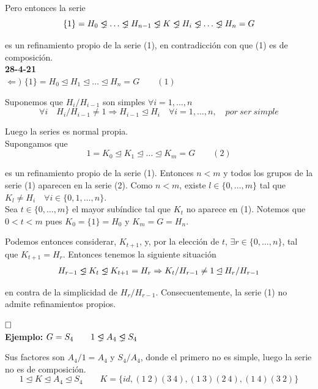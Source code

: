 \documentclass{article}
\newcommand{\unlhdneq}{%
  \mathrel{\ooalign{$\lneq$\cr\raise.22ex\hbox{$\lhd$}\cr}}}
\begin{document}
Pero entonces la serie
\begin{equation*}
\{1\}=H_0\unlhdneq \ldots \unlhdneq H_{n-1}\unlhdneq K\unlhdneq H_i\unlhdneq \ldots \unlhdneq H_n=G
\end{equation*}

es un refinamiento propio de la serie (1), en contradicción con que (1) es de composición. \\

\textbf{28-4-21} \\

$\Leftarrow)$ $\{1\}=H_0\unlhd H_1\unlhd \ldots \unlhd H_n=G \qquad (1)$

Suponemos que $H_i/H_{i-1}$ son simples $\forall i=1,\ldots,n$ 
\begin{equation*}
\forall i \quad H_i/H_{i-1}\neq 1 \Rightarrow H_{i-1}\unlhd H_i \quad \forall i=1,\ldots,n,\quad por\:ser\:simple
\end{equation*} 

Luego la series es normal propia. \\

Supongamos que 
\begin{equation*}
1=K_0\unlhd K_1\unlhd \ldots \unlhd K_m=G\qquad (2)
\end{equation*}

es un refinamiento propio de la serie (1). Entonces $n<m$ y todos los grupos de la serie (1) aparecen en la serie (2). Como $n<m$, existe $l\in\{0,\ldots,m\}$ tal que $K_l\neq H_i \quad \forall i\in \{0,1,\ldots,n\}$. \\

Sea $t\in \{0,\ldots,m\}$ el mayor subíndice tal que $K_t$ no aparece en (1). Notemos que $0<t<m$ pues $K_0=\{1\}=H_0$ y $K_m=G=H_n$.

Podemos entonces considerar, $K_{t+1}$, y, por la elección de $t$, $\exists r\in\{0,\ldots,n\}$, tal que $K_{t+1}=H_r$. Entonces tenemos la siguiente situación
\begin{gather*}
H_{r-1}\unlhdneq K_t\unlhdneq K_{t+1}=H_r \Rightarrow K_t/H_{r-1}\neq 1 \unlhd H_r/H_{r-1}
\end{gather*}

en contra de la simplicidad de $H_r/H_{r-1}$. Consecuentemente, la serie (1) no admite refinamientos propios.

$\hfill\square$ \\

\textbf{Ejemplo:} $G=S_4 \qquad 1\unlhdneq A_4\unlhdneq S_4$

Sus factores son $
A_4/1=A_4$ y $
S_4/A_4
$, donde el primero no es simple, luego la serie no es de composición.
\begin{equation*}
1\unlhd K\unlhd A_4\unlhd S_4\qquad K=\{id,(1\:2)(3\:4),(1\:3)(2\:4),(1\:4)(3\:2)\}
\end{equation*}
\end{document}
